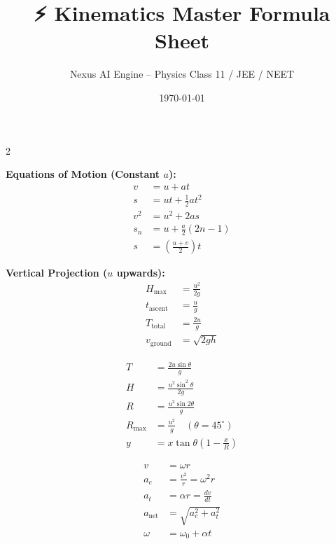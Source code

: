 \documentclass[a4paper,10pt]{article}
\title{\textbf{⚡ Kinematics Master Formula Sheet}}
\author{Nexus AI Engine -- Physics Class 11 / JEE / NEET}
\date{\today}
\begin{document}
\maketitle

\begin{multicols*}{2}

\begin{tcolorbox}[title=1. Motion in a Straight Line (1D), colback=white, colframe=teal]
\textbf{Equations of Motion (Constant $a$):}
\begin{align*}
v &= u + at \\
s &= ut + \frac{1}{2}at^2 \\
v^2 &= u^2 + 2as \\
s_n &= u + \frac{a}{2}(2n - 1) \\
s &= \left(\frac{u+v}{2}\right)t
\end{align*}
\end{tcolorbox}

\begin{tcolorbox}[title=2. Motion Under Gravity (Free Fall), colback=white, colframe=teal]
\textbf{Vertical Projection ($u$ upwards):}
\begin{align*}
H_{\max} &= \frac{u^2}{2g} \\
t_{\text{ascent}} &= \frac{u}{g} \\
T_{\text{total}} &= \frac{2u}{g} \\
v_{\text{ground}} &= \sqrt{2gh}
\end{align*}
\end{tcolorbox}

\begin{tcolorbox}[title=3. Oblique Projectile Motion, colback=white, colframe=teal]
\begin{align*}
T &= \frac{2u\sin\theta}{g} \\
H &= \frac{u^2\sin^2\theta}{2g} \\
R &= \frac{u^2\sin 2\theta}{g} \\
R_{\max} &= \frac{u^2}{g} \quad (\theta = 45^\circ) \\
y &= x\tan\theta\left(1 - \frac{x}{R}\right)
\end{align*}
\end{tcolorbox}

\begin{tcolorbox}[title=4. Circular Motion Kinematics, colback=white, colframe=teal]
\begin{align*}
v &= \omega r \\
a_c &= \frac{v^2}{r} = \omega^2 r \\
a_t &= \alpha r = \frac{dv}{dt} \\
a_{\text{net}} &= \sqrt{a_c^2 + a_t^2} \\
\omega &= \omega_0 + \alpha t
\end{align*}
\end{tcolorbox}

\end{multicols*}
\end{document}
